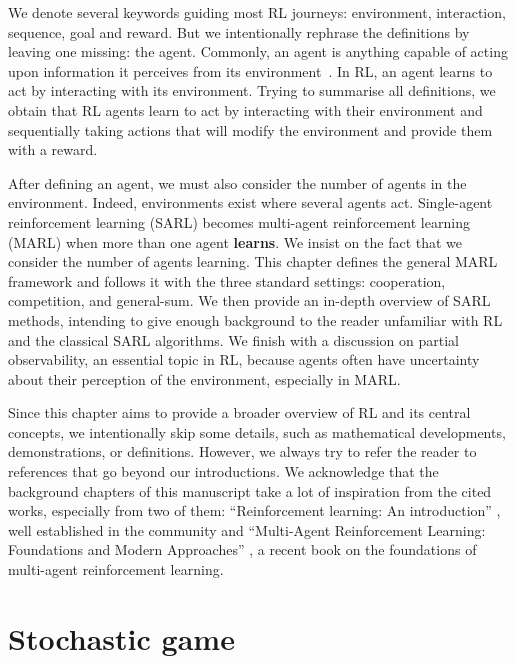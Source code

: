 We denote several keywords guiding most RL journeys: environment, interaction, sequence, goal and reward.
But we intentionally rephrase the definitions by leaving one missing: the agent.
Commonly, an agent is anything capable of acting upon information it perceives from its environment~\citep{russel2010}.
In RL, an agent learns to act by interacting with its environment. 
Trying to summarise all definitions, we obtain that RL agents learn to act by interacting with their environment and sequentially taking actions that will modify the environment and provide them with a reward.

After defining an agent, we must also consider the number of agents in the environment.
Indeed, environments exist where several agents act.
Single-agent reinforcement learning (SARL) becomes multi-agent reinforcement learning (MARL) when more than one agent \textbf{learns}.
We insist on the fact that we consider the number of agents learning.
This chapter defines the general MARL framework and follows it with the three standard settings: cooperation, competition, and general-sum.
We then provide an in-depth overview of SARL methods, intending to give enough background to the reader unfamiliar with RL and the classical SARL algorithms.
We finish with a discussion on partial observability, an essential topic in RL, because agents often have uncertainty about their perception of the environment, especially in MARL.

Since this chapter aims to provide a broader overview of RL and its central concepts, we intentionally skip some details, such as mathematical developments, demonstrations, or definitions.
However, we always try to refer the reader to references that go beyond our introductions.
We acknowledge that the background chapters of this manuscript take a lot of inspiration from the cited works, especially from two of them: ``Reinforcement learning: An introduction'' \citep{sutton2018reinforcement}, well established in the community and ``Multi-Agent Reinforcement Learning: Foundations and Modern Approaches'' \citep{marl-book}, a recent book on the foundations of multi-agent reinforcement learning.

\section{Stochastic game}
\label{sec:ch2_stochastic_Game}

